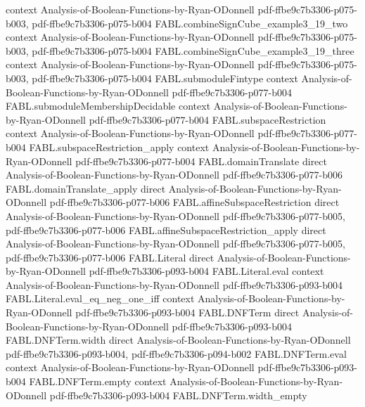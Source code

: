 \begin{theorem}
  {context}
  {Analysis-of-Boolean-Functions-by-Ryan-ODonnell}
  {pdf-ffbe9c7b3306-p075-b003,
    pdf-ffbe9c7b3306-p075-b004}
\proofstep
  {FABL.combineSignCube_example3_19_two}
  {context}
  {Analysis-of-Boolean-Functions-by-Ryan-ODonnell}
  {pdf-ffbe9c7b3306-p075-b003,
    pdf-ffbe9c7b3306-p075-b004}
\proofstep
  {FABL.combineSignCube_example3_19_three}
  {context}
  {Analysis-of-Boolean-Functions-by-Ryan-ODonnell}
  {pdf-ffbe9c7b3306-p075-b003,
    pdf-ffbe9c7b3306-p075-b004}
\proofstep
  {FABL.submoduleFintype}
  {context}
  {Analysis-of-Boolean-Functions-by-Ryan-ODonnell}
  {pdf-ffbe9c7b3306-p077-b004}
\proofstep
  {FABL.submoduleMembershipDecidable}
  {context}
  {Analysis-of-Boolean-Functions-by-Ryan-ODonnell}
  {pdf-ffbe9c7b3306-p077-b004}
\proofstep
  {FABL.subspaceRestriction}
  {context}
  {Analysis-of-Boolean-Functions-by-Ryan-ODonnell}
  {pdf-ffbe9c7b3306-p077-b004}
\proofstep
  {FABL.subspaceRestriction_apply}
  {context}
  {Analysis-of-Boolean-Functions-by-Ryan-ODonnell}
  {pdf-ffbe9c7b3306-p077-b004}
\proofstep
  {FABL.domainTranslate}
  {direct}
  {Analysis-of-Boolean-Functions-by-Ryan-ODonnell}
  {pdf-ffbe9c7b3306-p077-b006}
\proofstep
  {FABL.domainTranslate_apply}
  {direct}
  {Analysis-of-Boolean-Functions-by-Ryan-ODonnell}
  {pdf-ffbe9c7b3306-p077-b006}
\proofstep
  {FABL.affineSubspaceRestriction}
  {direct}
  {Analysis-of-Boolean-Functions-by-Ryan-ODonnell}
  {pdf-ffbe9c7b3306-p077-b005,
    pdf-ffbe9c7b3306-p077-b006}
\proofstep
  {FABL.affineSubspaceRestriction_apply}
  {direct}
  {Analysis-of-Boolean-Functions-by-Ryan-ODonnell}
  {pdf-ffbe9c7b3306-p077-b005,
    pdf-ffbe9c7b3306-p077-b006}
\proofstep
  {FABL.Literal}
  {direct}
  {Analysis-of-Boolean-Functions-by-Ryan-ODonnell}
  {pdf-ffbe9c7b3306-p093-b004}
\proofstep
  {FABL.Literal.eval}
  {context}
  {Analysis-of-Boolean-Functions-by-Ryan-ODonnell}
  {pdf-ffbe9c7b3306-p093-b004}
\proofstep
  {FABL.Literal.eval_eq_neg_one_iff}
  {context}
  {Analysis-of-Boolean-Functions-by-Ryan-ODonnell}
  {pdf-ffbe9c7b3306-p093-b004}
\proofstep
  {FABL.DNFTerm}
  {direct}
  {Analysis-of-Boolean-Functions-by-Ryan-ODonnell}
  {pdf-ffbe9c7b3306-p093-b004}
\proofstep
  {FABL.DNFTerm.width}
  {direct}
  {Analysis-of-Boolean-Functions-by-Ryan-ODonnell}
  {pdf-ffbe9c7b3306-p093-b004,
    pdf-ffbe9c7b3306-p094-b002}
\proofstep
  {FABL.DNFTerm.eval}
  {context}
  {Analysis-of-Boolean-Functions-by-Ryan-ODonnell}
  {pdf-ffbe9c7b3306-p093-b004}
\proofstep
  {FABL.DNFTerm.empty}
  {context}
  {Analysis-of-Boolean-Functions-by-Ryan-ODonnell}
  {pdf-ffbe9c7b3306-p093-b004}
\proofstep
  {FABL.DNFTerm.width_empty}

\end{theorem}

